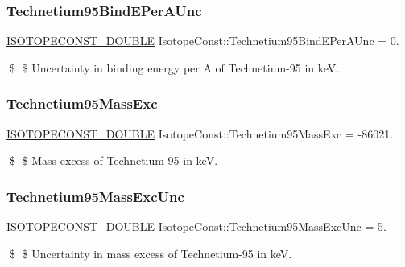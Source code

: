 \subsubsection{\texorpdfstring{Technetium95\+Bind\+E\+Per\+A\+Unc}{Technetium95BindEPerAUnc}}
{\footnotesize\ttfamily \mbox{\hyperlink{group___isotope_const-_macros_ga8f45a7272ce02c0b4c65c44636ed719a}{I\+S\+O\+T\+O\+P\+E\+C\+O\+N\+S\+T\+\_\+\+D\+O\+U\+B\+LE}} Isotope\+Const\+::\+Technetium95\+Bind\+E\+Per\+A\+Unc = 0.}

\$ \$ Uncertainty in binding energy per A of Technetium-\/95 in keV. \mbox{\label{group___isotope_const-_technetium-_tc95_ga5c0129255ff90c6e1547b113cf525c91}} 
\subsubsection{\texorpdfstring{Technetium95\+Mass\+Exc}{Technetium95MassExc}}
{\footnotesize\ttfamily \mbox{\hyperlink{group___isotope_const-_macros_ga8f45a7272ce02c0b4c65c44636ed719a}{I\+S\+O\+T\+O\+P\+E\+C\+O\+N\+S\+T\+\_\+\+D\+O\+U\+B\+LE}} Isotope\+Const\+::\+Technetium95\+Mass\+Exc = -\/86021.}

\$ \$ Mass excess of Technetium-\/95 in keV. \mbox{\label{group___isotope_const-_technetium-_tc95_ga511e640611fc678f8f2356dd64a87491}} 
\subsubsection{\texorpdfstring{Technetium95\+Mass\+Exc\+Unc}{Technetium95MassExcUnc}}
{\footnotesize\ttfamily \mbox{\hyperlink{group___isotope_const-_macros_ga8f45a7272ce02c0b4c65c44636ed719a}{I\+S\+O\+T\+O\+P\+E\+C\+O\+N\+S\+T\+\_\+\+D\+O\+U\+B\+LE}} Isotope\+Const\+::\+Technetium95\+Mass\+Exc\+Unc = 5.}

\$ \$ Uncertainty in mass excess of Technetium-\/95 in keV. \mbox{\label{group___isotope_const-_technetium-_tc95_ga6c417e75273666b345a21f84874ac170}} 
